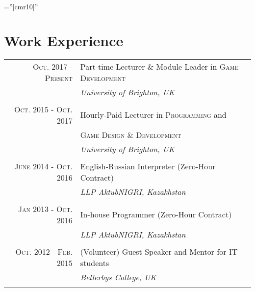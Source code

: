 \documentclass[a4paper,10pt]{article} %
\begin{document}
\pagestyle{empty} %

\font\fb=''[cmr10]'' %


\par{\bigskip\par} %


\section{Work Experience}

\begin{tabular}{r|p{11cm}}

\textsc{Oct. 2017 - Present} & Part-time Lecturer \& Module Leader in \textsc{Game Development}\\
& \emph{University of Brighton, UK}\\
\multicolumn{2}{c}{} \\


\textsc{Oct. 2015 - Oct. 2017} & Hourly-Paid Lecturer in \textsc{Programming} and\\
& \textsc{Game Design \& Development}\\
& \emph{University of Brighton, UK}\\
\multicolumn{2}{c}{} \\


\textsc{June 2014 - Oct. 2016} & English-Russian Interpreter (Zero-Hour Contract)\\
& \emph{LLP AktubNIGRI, Kazakhstan}\\
\multicolumn{2}{c}{} \\


\textsc{Jan 2013 - Oct. 2016} & In-house Programmer (Zero-Hour Contract)\\
& \emph{LLP AktubNIGRI, Kazakhstan}\\
\multicolumn{2}{c}{} \\


\textsc{Oct. 2012 - Feb. 2015} & (Volunteer) Guest Speaker and Mentor for IT students\\
& \emph{Bellerbys College, UK}\\
\multicolumn{2}{c}{} \\

\end{tabular}
\vspace{0.1cm}
\end{document}
